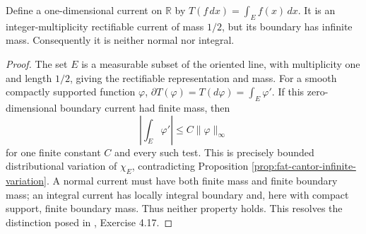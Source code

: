 \begin{example}\label{ex:fat-cantor-nonnormal-current}
Define a one-dimensional current on $\mathbb R$ by $T(f\,dx)=\int_E f(x)\,dx$. It is an integer-multiplicity rectifiable current of mass $1/2$, but its boundary has infinite mass. Consequently it is neither normal nor integral.
\end{example}
\begin{proof}
The set $E$ is a measurable subset of the oriented line, with multiplicity one and length $1/2$, giving the rectifiable representation and mass. For a smooth compactly supported function $\varphi$, $\partial T(\varphi)=T(d\varphi)=\int_E\varphi'$. If this zero-dimensional boundary current had finite mass, then
\[
 \left|\int_E\varphi'\right|\le C\|\varphi\|_\infty
\]
for one finite constant $C$ and every such test. This is precisely bounded distributional variation of $\chi_E$, contradicting Proposition \ref{prop:fat-cantor-infinite-variation}. A normal current must have both finite mass and finite boundary mass; an integral current has locally integral boundary and, here with compact support, finite boundary mass. Thus neither property holds. This resolves the distinction posed in \cite{Mor16}, Exercise 4.17.
\end{proof}
